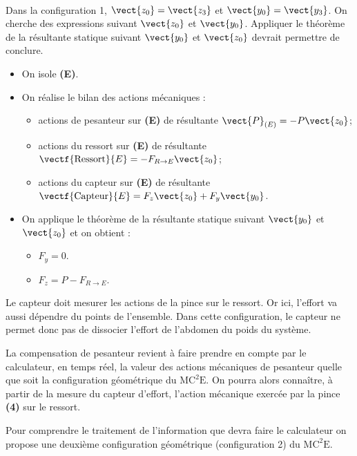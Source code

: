 \ifprof
\begin{corrige}~\\

\begin{methode}
Dans la configuration 1, $\vect{z_0}=\vect{z_3}$ et $\vect{y_0}=\vect{y_3}$. On cherche des expressions suivant $\vect{z_0}$ et $\vect{y_0}$. Appliquer le théorème de la résultante statique suivant $\vect{y_0}$ et $\vect{z_0}$ devrait permettre de conclure. 
\end{methode}
\begin{itemize}
\item On isole \textbf{(E)}.
\item On réalise le bilan des actions mécaniques : 
\begin{itemize}
\item actions de pesanteur sur \textbf{(E)} de résultante $\vect{P}_{(E)}=-P\vect{z_0}$;
\item actions du ressort sur \textbf{(E)} de résultante $\vectf{\text{Ressort}}{E}=-F_{R\to E} \vect{z_0}$;
\item actions du capteur sur \textbf{(E)} de résultante $\vectf{\text{Capteur}}{E}=F_z\vect{z_0}+F_y\vect{y_0}$.
\end{itemize}
\item On applique le théorème de la résultante statique suivant $\vect{y_0}$ et $\vect{z_0}$ et on obtient : 
\begin{itemize}
\item $F_y = 0$. 
\item $F_z = P- F_{R\to E}$. 
\end{itemize}
\end{itemize}
Le capteur doit mesurer les actions de la pince sur le ressort. Or ici, l'effort va aussi dépendre du points de l’ensemble. Dans cette configuration, le capteur ne permet donc pas de dissocier l'effort de l'abdomen du poids du système.
\end{corrige}
\else
\fi

\ifprof
\else
La compensation de pesanteur revient à faire prendre en compte par le calculateur, en temps réel, la valeur des actions mécaniques de pesanteur quelle que soit la configuration géométrique du $\text{MC}^2\text{E}$. On pourra alors connaître, à partir de la mesure du capteur d’effort, l’action mécanique exercée par la pince \textbf{(4)} sur le ressort.

Pour comprendre le traitement de l’information que devra faire le calculateur on propose une deuxième configuration géométrique (configuration 2) du $\text{MC}^2\text{E}$.

